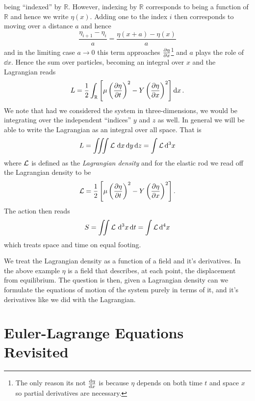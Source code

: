 being ``indexed'' by \(\mathbb{R}\). However, indexing by \(\mathbb{R}\)
corresponds to being a function of \(\mathbb{R}\) and hence we write
\(\eta(x)\). Adding one to the index \(i\) then corresponds to moving over a
distance \(a\) and hence
\begin{equation}
    \frac{\eta_{i + 1} - \eta_i}{a} = \frac{\eta(x + a) - \eta(x)}{a}
\end{equation}
and in the limiting case \(a\to 0\) this term approaches
\(\pdv{\eta}{x}\)\footnote{The only reason its not \(\dv{\eta}{x}\) is because
\(\eta\) depends on both time \(t\) and space \(x\) so partial derivatives are
necessary.} and \(a\) plays the role of \(\dd{x}\). Hence the sum over
particles, becoming an integral over \(x\) and the Lagrangian reads
\begin{equation}\label{eq:contLag}
    L = \frac{1}{2}\int_\mathbb{R}\left[\mu\left(\pdv{\eta}{t}\right)^2 - Y\left(\pdv{\eta}{x}\right)^2\right]\dd{x}.
\end{equation}
We note that had we considered the system in three-dimensions, we would be
integrating over the independent ``indices'' \(y\) and \(z\) as well. In general
we will be able to write the Lagrangian as an integral over all space. That is
\begin{equation}\label{eq:lagDens}
    L = \iiint\mathcal{L}\,\dd{x}\dd{y}\dd{z} = \int\mathcal{L} \dd[3]{x}
\end{equation}
where \(\mathcal{L}\) is defined as the \textit{Lagrangian density} and for the elastic
rod we read off the Lagrangian density to be
\begin{equation}
    \mathcal{L} = \frac{1}{2}\left[\mu\left(\pdv{\eta}{t}\right)^2 - Y\left(\pdv{\eta}{x}\right)^2\right].
\end{equation}
The action then reads
\begin{equation}
    S = \iint\mathcal{L}\,\dd[3]{x}\dd{t} = \int\mathcal{L}\dd[4]{x}
\end{equation}
which treats space and time on equal footing.

We treat the Lagrangian density as a function of a field and it's derivatives.
In the above example \(\eta\) is a field that describes, at each point, the
displacement from equilibrium. The question is then, given a Lagrangian density
can we formulate the equations of motion of the system purely in terms of it,
and it's derivatives like we did with the Lagrangian.  

\section{Euler-Lagrange Equations Revisited}

